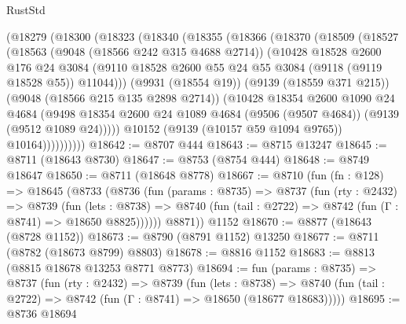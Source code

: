 \begin{lexlean}{RustStd}
\begin{coremodule}
        (@18279
          (@18300
            (@18323
              (@18340
                (@18355
                  (@18366
                    (@18370
                      (@18509
                        (@18527
                          (@18563
                            (@9048 (@18566 @242 @315 @4688 @2714))
                            (@10428
                              @18528
                              @2600
                              @176
                              @24
                              @3084
                              (@9110
                                @18528
                                @2600
                                @55
                                @24
                                @55
                                @3084
                                (@9118 (@9119 @18528 @55))
                                @11044)))
                          (@9931 (@18554 @19))
                          (@9139 (@18559 @371 @215))
                          (@9048 (@18566 @215 @135 @2898 @2714))
                          (@10428
                            @18354
                            @2600
                            @1090
                            @24
                            @4684
                            (@9498
                              @18354
                              @2600
                              @24
                              @1089
                              @4684
                              (@9506 (@9507 @4684))
                              (@9139 (@9512 @1089 @24)))))
                        @10152
                        (@9139 (@10157 @59 @1094 @9765))
                        @10164))))))))))
@18642 := @8707 @444
@18643 := @8715 @13247
@18645 := @8711 (@18643 @8730)
@18647 := @8753 (@8754 @444)
@18648 := @8749 @18647
@18650 := @8711 (@18648 @8778)
@18667 := @8710
    (fun (fn : @128) =>
    @18645
      (@8733
        (@8736
          (fun (params : @8735) =>
          @8737
            (fun (rty : @2432) =>
            @8739
              (fun (lets : @8738) =>
              @8740 (fun (tail : @2722) => @8742 (fun (Γ : @8741) => @18650 @8825))))))
        @8871))
    @1152
@18670 := @8877 (@18643 (@8728 @1152))
@18673 := @8790 (@8791 @1152) @13250
@18677 := @8711 (@8782 (@18673 @8799) @8803)
@18678 := @8816 @1152
@18683 := @8813 (@8815 @18678 @13253 @8771 @8773)
@18694 := fun (params : @8735) =>
  @8737
    (fun (rty : @2432) =>
    @8739
      (fun (lets : @8738) =>
      @8740 (fun (tail : @2722) => @8742 (fun (Γ : @8741) => @18650 (@18677 @18683)))))
@18695 := @8736 @18694

\end{coremodule}
\end{lexlean}
